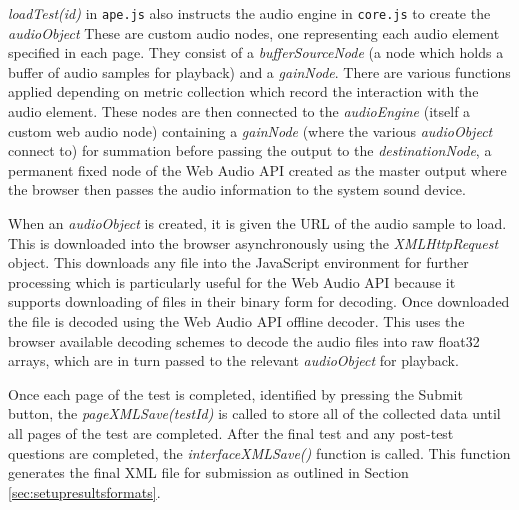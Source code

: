 \documentclass{article}
\begin{document}
\textit{loadTest(id)} in \texttt{ape.js} also instructs the audio engine in \texttt{core.js} to create the \textit{audioObject} These are custom audio nodes, one representing each audio element specified in each page.
They consist of a \textit{bufferSourceNode} (a node which holds a buffer of audio samples for playback) and a \textit{gainNode}. There are various functions applied depending on metric collection which record the interaction with the audio element. These nodes are then connected to the \textit{audioEngine} (itself a custom web audio node) containing a \textit{gainNode} (where the various \textit{audioObject} connect to) for summation before passing the output to the \textit{destinationNode}, a permanent fixed node of the Web Audio API created as the master output where the browser then passes the audio information to the system sound device. %

When an \textit{audioObject} is created, it is given the URL of the audio sample to load. This is downloaded into the browser asynchronously using the \textit{XMLHttpRequest} object. This downloads any file into the JavaScript environment for further processing which is particularly useful for the Web Audio API because it supports downloading of files in their binary form for decoding. Once downloaded the file is decoded using the Web Audio API offline decoder. This uses the browser available decoding schemes to decode the audio files into raw float32 arrays, which are in turn passed to the relevant \textit{audioObject} for playback.

Once each page of the test is completed, identified by pressing the Submit button, the \textit{pageXMLSave(testId)} is called to store all of the collected data until all pages of the test are completed. After the final test and any post-test questions are completed, the \textit{interfaceXMLSave()} function is called. This function generates the final XML file for submission as outlined in Section \ref{sec:setupresultsformats}.
\end{document}
